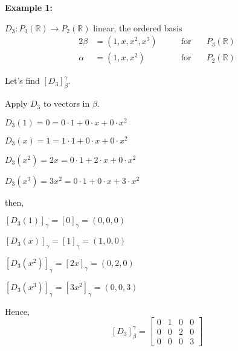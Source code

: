 \documentclass[12pt]{article}
\theoremstyle{plain}
\newcommand{\mR}{{\mathbb{R}}}
\begin{document}
	
	{\color{Brown}
		\textbf{Example 1:}
		
		$D_3 : P_3 (\mR) \to P_2 (\mR)$ linear, the ordered basis
		\begin{alignat*}{2}
			\beta &= (1, x, x^2, x^3) \qquad &\text{for} \quad & P_3(\mR)\\
			\alpha &= (1, x, x^2) \qquad &\text{for} \quad & P_2 (\mR)
		\end{alignat*}

		Let's find $[D_3]^{\gamma}_{\beta} $. 

		Apply $D_3$ to vectors in $\beta$. 
		\begin{description}
			\item $D_3(1) = 0 = 0 \cdot 1 + 0 \cdot x + 0 \cdot x^2$
			\item $D_3(x) = 1 = 1 \cdot 1 + 0 \cdot x + 0 \cdot x^2$
			\item $D_3(x^2) = 2x = 0 \cdot 1 + 2 \cdot x + 0 \cdot x^2$
			\item $D_3(x^3) = 3x^2 = 0 \cdot 1 + 0 \cdot x + 3 \cdot x^2$
		\end{description}
		then, 
		\begin{description}
			\item $[D_3(1)]_{\gamma} = [0]_{\gamma} = (0, 0, 0)$
			\item $[D_3(x)]_{\gamma} = [1]_{\gamma} = (1, 0, 0)$
			\item $[D_3(x^2)]_{\gamma} = [2x]_{\gamma} = (0, 2, 0)$
			\item $[D_3(x^3)]_{\gamma} = [3x^2]_{\gamma} = (0, 0, 3)$
		\end{description}
		Hence, 
		\[
			[D_3]^{\gamma}_{\beta} = 
			\begin{bmatrix}
				0 & 1 & 0 & 0\\
				0 & 0 & 2 & 0\\
				0 & 0 & 0 & 3
			\end{bmatrix}
		\]
	}
	
\end{document}
